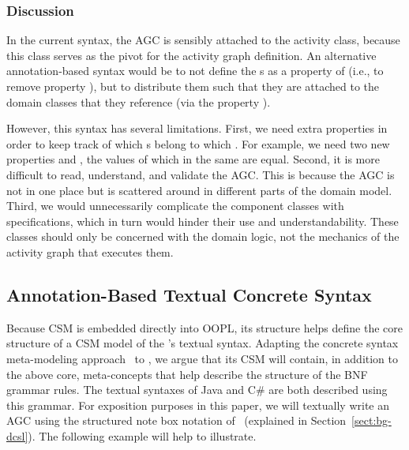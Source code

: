 \subsubsection*{Discussion} \label{sect:agl-discussion} %
In the current syntax, the AGC is sensibly attached to the activity class, because this class serves as the pivot for the activity graph definition.
%
An alternative annotation-based syntax would be to not define the s as a property of  (i.e., to remove property ), but to distribute them such that they are attached to the domain classes that they reference (via the property ). 

However, this syntax has several limitations. First, we need extra properties in order to keep track of which s belong to which . For example, we need two new properties  and , the values of which in the same  are equal. 
Second, it is more difficult to read, understand, and validate the AGC. This is because the AGC is not in one place but is scattered around in different parts of the domain model.
Third, we would unnecessarily complicate the component classes with  specifications, which in turn would hinder their use and understandability. These classes should only be concerned with the domain logic, not the mechanics of the activity graph that executes them.

\subsection{Annotation-Based Textual Concrete Syntax} 
\label{sect:agl-csSyntax}

Because CSM is embedded directly into OOPL, its structure helps define the core structure of a CSM model of the \agl's textual syntax. Adapting the concrete syntax meta-modeling approach~\cite{kleppe_software_2008} to \agl, we argue that its CSM will contain, in addition to the above core, meta-concepts that help describe the structure of the BNF grammar rules. The textual syntaxes of Java and C\# are both described using this grammar.
%
For exposition purposes in this paper, we will textually write an AGC using the structured note box notation of \dcsl~(explained in Section~\ref{sect:bg-dcsl}). The following example will help to illustrate.

